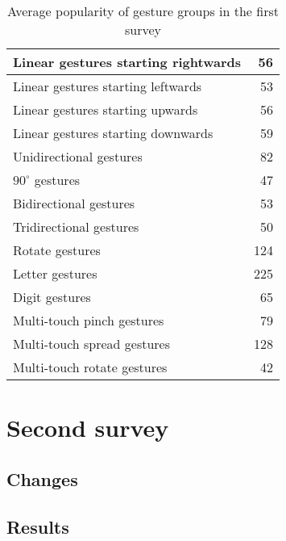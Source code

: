 \documentclass{aes130}
\begin{document}
\begin{table} \label{tab:Survey1AverageGroups}
\begin{center}
\begin{tabular}{|l|r|} \hline

Linear gestures starting rightwards &  56 \\ \hline
Linear gestures starting leftwards  &  53 \\ \hline
Linear gestures starting upwards    &  56 \\ \hline
Linear gestures starting downwards  &  59 \\ \hline \hline

Unidirectional gestures             &  82 \\ \hline
$90^\circ$ gestures                 &  47 \\ \hline
Bidirectional gestures              &  53 \\ \hline
Tridirectional gestures             &  50 \\ \hline \hline

Rotate gestures                     & 124 \\ \hline \hline

Letter gestures                     & 225 \\ \hline
Digit gestures                      &  65 \\ \hline \hline

Multi-touch pinch gestures          &  79 \\ \hline
Multi-touch spread gestures         & 128 \\ \hline
Multi-touch rotate gestures         &  42 \\ \hline

\end{tabular}
\end{center}
\caption{Average popularity of gesture groups in the first survey}
\end{table}


\section{Second survey} \label{sec:Survey2}

\subsection{Changes} \label{sec:Survey2Changes}

\subsection{Results} \label{sec:Survey2Results}
\end{document}
